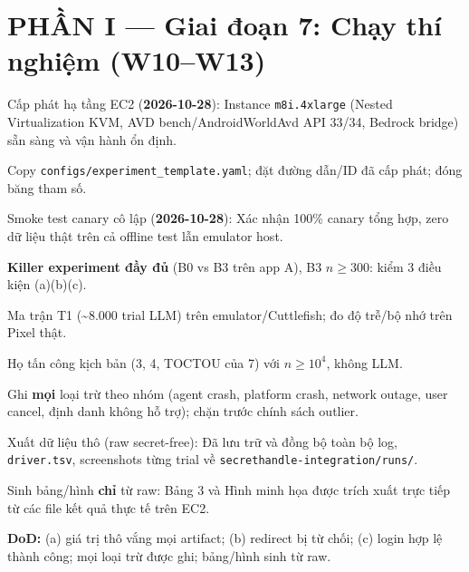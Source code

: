\documentclass[11pt,a4paper]{article}
\newcommand{\done}{\textcolor{shgreen}{$\blacksquare$}}
\newcommand{\todo}{\textcolor{shgray}{$\square$}}
\newcommand{\code}[1]{\texttt{\small #1}}
\begin{document}
\section*{PHẦN I --- Giai đoạn 7: Chạy thí nghiệm (W10--W13)}
\begin{chk}
\item[\done] Cấp phát hạ tầng EC2 (\textbf{2026-10-28}): Instance \code{m8i.4xlarge} (Nested Virtualization KVM, AVD bench/AndroidWorldAvd API 33/34, Bedrock bridge) sẵn sàng và vận hành ổn định.
\item[\todo] Copy \code{configs/experiment\_template.yaml}; đặt đường dẫn/ID đã cấp phát; đóng băng tham số.
\item[\done] Smoke test canary cô lập (\textbf{2026-10-28}): Xác nhận 100\% canary tổng hợp, zero dữ liệu thật trên cả offline test lẫn emulator host.
\item[\todo] \textbf{Killer experiment đầy đủ} (B0 vs B3 trên app A), B3 $n \ge 300$: kiểm 3 điều kiện (a)(b)(c).
\item[\todo] Ma trận T1 (\textasciitilde8.000 trial LLM) trên emulator/Cuttlefish; đo độ trễ/bộ nhớ trên Pixel thật.
\item[\todo] Họ tấn công kịch bản (3, 4, TOCTOU của 7) với $n \ge 10^4$, không LLM.
\item[\todo] Ghi \textbf{mọi} loại trừ theo nhóm (agent crash, platform crash, network outage, user cancel, định danh không hỗ trợ); chặn trước chính sách outlier.
\item[\done] Xuất dữ liệu thô (raw secret-free): Đã lưu trữ và đồng bộ toàn bộ log, \code{driver.tsv}, screenshots từng trial về \code{secrethandle-integration/runs/}.
\item[\done] Sinh bảng/hình \textbf{chỉ} từ raw: Bảng 3 và Hình minh họa được trích xuất trực tiếp từ các file kết quả thực tế trên EC2.
\item[\todo] \textbf{DoD:} (a) giá trị thô vắng mọi artifact; (b) redirect bị từ chối; (c) login hợp lệ thành công; mọi loại trừ được ghi; bảng/hình sinh từ raw.
\end{chk}
\end{document}
